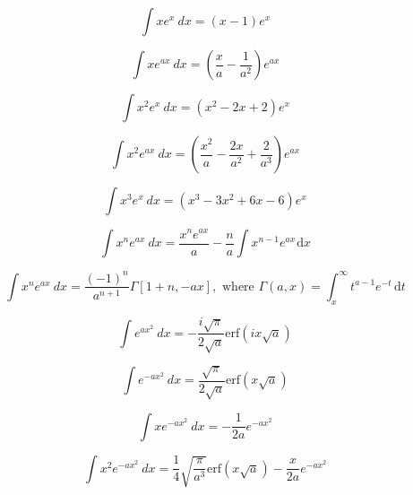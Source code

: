 \documentclass[12pt,a4paper,leqno]{article}
\begin{document}
   \begin{equation}
   \int x e^x\ dx = (x-1) e^x
   \end{equation}

   \begin{equation}
   \int x e^{ax}\ dx = \left(\frac{x}{a}-\frac{1}{a^2}\right) e^{ax}
   \end{equation}

   \begin{equation}
   \int x^2 e^{x}\ dx = \left(x^2 - 2x + 2\right) e^{x}
   \end{equation}

   \begin{equation}
   \int x^2 e^{ax}\ dx = \left(\frac{x^2}{a}-\frac{2x}{a^2}+\frac{2}{a^3}\right) e^{ax}
   \end{equation}

   \begin{equation}
   \int x^3 e^{x}\ dx = \left(x^3-3x^2 + 6x - 6\right) e^{x}
   \end{equation}

   \begin{equation}\label{eq:swift1}
   \int x^n e^{ax}\ dx = \dfrac{x^n e^{ax}}{a} -
   \dfrac{n}{a}\int x^{n-1}e^{ax}\hspace{1pt}\text{d}x
   \end{equation}

   \begin{equation}\label{eq:ebke}
   \int x^n e^{ax}\ dx = \frac{(-1)^n}{a^{n+1}}\Gamma[1+n,-ax],
    \text{ where } \Gamma(a,x)=\int_x^{\infty} t^{a-1}e^{-t}\hspace{2pt}\text{d}t
    \end{equation}

   \begin{equation}\label{eq:swift2}
   \int e^{ax^2}\ dx = -\frac{i\sqrt{\pi}}{2\sqrt{a}}\text{erf}\left(ix\sqrt{a}\right)
   \end{equation}

   \begin{equation}\label{eq:swift3}
   \int e^{-ax^2}\ dx = \frac{\sqrt{\pi}}{2\sqrt{a}}\text{erf}\left(x\sqrt{a}\right)
   \end{equation}

   \begin{equation}\label{eq:qarles1}
   \int x e^{-ax^2}\ {dx} = -\dfrac{1}{2a}e^{-ax^2}
   \end{equation}

   \begin{equation}\label{eq:qarles2}
   \int x^2 e^{-ax^2}\ {dx} = \dfrac{1}{4}\sqrt{\dfrac{\pi}{a^3}}\text{erf}(x\sqrt{a}) -\dfrac{x}{2a}e^{-ax^2}
   \end{equation}
\end{document}
